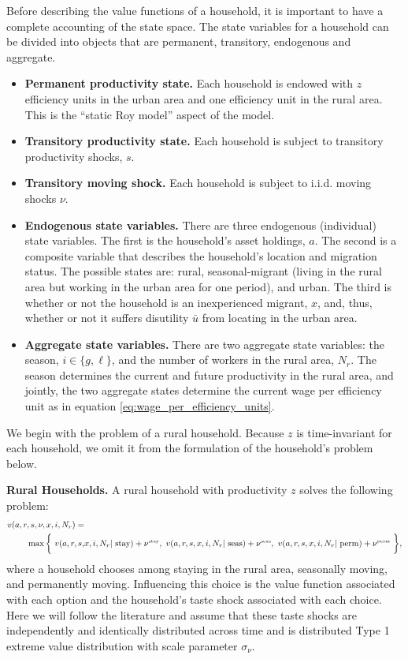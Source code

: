 \documentclass[pdftex,11pt]{article}
\begin{document}
Before describing the value functions of a household, it is important to have a complete accounting of the state space. The state variables for a household can be divided into objects that are permanent, transitory, endogenous and aggregate.
\begin{itemize}
\item \textbf{Permanent productivity state.} Each household is endowed with $z$ efficiency units in the urban area and one efficiency unit in the rural area. This is the ``static Roy model'' aspect of the model.

\item \textbf{Transitory productivity state.} Each household is subject to transitory productivity shocks, $s$.

\item \textbf{Transitory moving shock.} Each household is subject to i.i.d. moving shocks $\nu$.

\item \textbf{Endogenous state variables.} There are three endogenous (individual) state variables. The first is the household's asset holdings, $a$. The second is a composite variable that describes the household's location and migration status. The possible states are: rural, seasonal-migrant (living in the rural area but working in the urban area for one period), and urban. The third is whether or not the household is an inexperienced migrant, $x$, and, thus, whether or not it suffers disutility $\bar u$ from locating in the urban area.

\item \textbf{Aggregate state variables.} There are two aggregate state variables: the season, $i \in \{g,\ell \}$, and the number of workers in the rural area, $N_r$. The season determines the current and future productivity in the rural area, and jointly, the two aggregate states determine the current wage per efficiency unit as in equation \eqref{eq:wage_per_efficiency_units}.
\end{itemize}
We begin with the problem of a rural household. Because $z$ is time-invariant for each household, we omit it from the formulation of the household's problem below.

\textbf{Rural Households.} A rural household with productivity $z$ solves the following problem:
\begin{align}
\small
v(a, r, s, \nu, x, i, N_r) =& \nonumber \\
  \max \bigg\{ \ v(a, r,  s, & x, i, N_r| \ \mbox{stay}) + \nu^{\tiny\mbox{stay}},  \ v(a, r, s, x, i, N_r | \ \mbox{seas}) + \nu^{\tiny\mbox{seas}},\  v(a, r, s, x, i, N_r | \ \mbox{perm})+ \nu^{\tiny\mbox{perm}} \ \bigg \},
\label{eq:value_fun_rural}
\end{align}
where a household chooses among staying in the rural area, seasonally moving, and permanently moving. Influencing this choice is the value function associated with each option and the household's taste shock associated with each choice. Here we will follow the literature and assume that these taste shocks are independently and identically distributed across time and is distributed Type 1 extreme value distribution with scale parameter $\sigma_{\nu}$.
\end{document}
